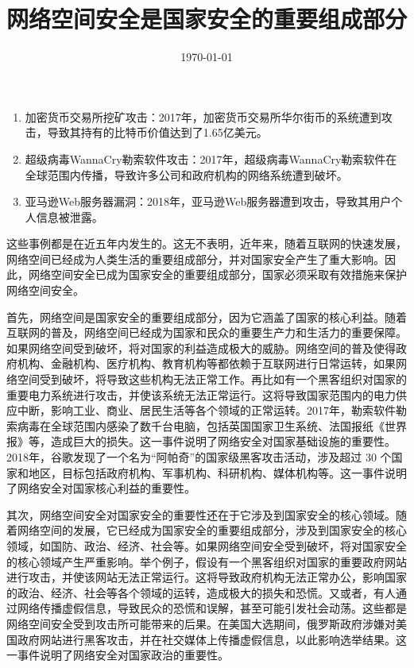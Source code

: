 \documentclass{ctexart}
\title{网络空间安全是国家安全的重要组成部分}
\date{\today}
\begin{document}
\maketitle

\begin{enumerate}
    \item 加密货币交易所挖矿攻击：2017年，加密货币交易所华尔街币的系统遭到攻击，导致其持有的比特币价值达到了1.65亿美元。
    \item 超级病毒WannaCry勒索软件攻击：2017年，超级病毒WannaCry勒索软件在全球范围内传播，导致许多公司和政府机构的网络系统遭到破坏。
    \item 亚马逊Web服务器漏洞：2018年，亚马逊Web服务器遭到攻击，导致其用户个人信息被泄露。
\end{enumerate}
这些事例都是在近五年内发生的。这无不表明，近年来，随着互联网的快速发展，网络空间已经成为人类生活的重要组成部分，并对国家安全产生了重大影响。因此，网络空间安全已成为国家安全的重要组成部分，国家必须采取有效措施来保护网络空间安全。

首先，网络空间是国家安全的重要组成部分，因为它涵盖了国家的核心利益。随着互联网的普及，网络空间已经成为国家和民众的重要生产力和生活力的重要保障。如果网络空间受到破坏，将对国家的利益造成极大的威胁。网络空间的普及使得政府机构、金融机构、医疗机构、教育机构等都依赖于互联网进行日常运转，如果网络空间受到破坏，将导致这些机构无法正常工作。再比如有一个黑客组织对国家的重要电力系统进行攻击，并使该系统无法正常运行。这将导致国家范围内的电力供应中断，影响工业、商业、居民生活等各个领域的正常运转。2017年，勒索软件勒索病毒在全球范围内感染了数千台电脑，包括英国国家卫生系统、法国报纸《世界报》等，造成巨大的损失。这一事件说明了网络安全对国家基础设施的重要性。2018年，谷歌发现了一个名为“阿帕奇”的国家级黑客攻击活动，涉及超过 30 个国家和地区，目标包括政府机构、军事机构、科研机构、媒体机构等。这一事件说明了网络安全对国家核心利益的重要性。

其次，网络空间安全对国家安全的重要性还在于它涉及到国家安全的核心领域。随着网络空间的发展，它已经成为国家安全的重要组成部分，涉及到国家安全的核心领域，如国防、政治、经济、社会等。如果网络空间安全受到破坏，将对国家安全的核心领域产生严重影响。举个例子，假设有一个黑客组织对国家的重要政府网站进行攻击，并使该网站无法正常运行。这将导致政府机构无法正常办公，影响国家的政治、经济、社会等各个领域的运转，造成极大的损失和恐慌。又或者，有人通过网络传播虚假信息，导致民众的恐慌和误解，甚至可能引发社会动荡。这些都是网络空间安全受到攻击所可能带来的后果。在美国大选期间，俄罗斯政府涉嫌对美国政府网站进行黑客攻击，并在社交媒体上传播虚假信息，以此影响选举结果。这一事件说明了网络安全对国家政治的重要性。
\end{document}
